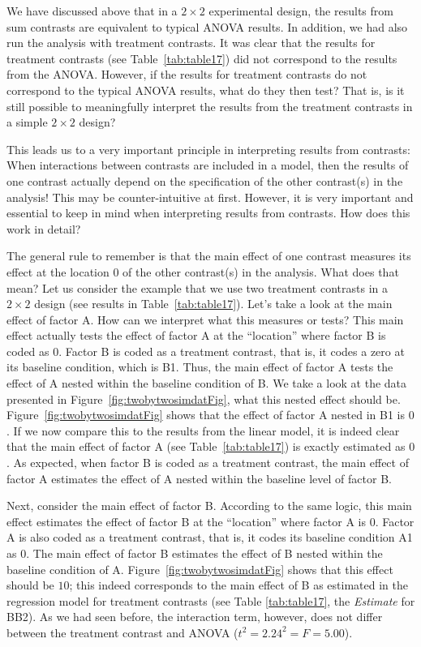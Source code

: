 \documentclass[12pt,]{krantz}
\begin{document}
We have discussed above that in a \(2 \times 2\) experimental design, the results from sum contrasts are equivalent to typical ANOVA results. In addition, we had also run the analysis with treatment contrasts. It was clear that the results for treatment contrasts (see Table~\ref{tab:table17}) did not correspond to the results from the ANOVA. However, if the results for treatment contrasts do not correspond to the typical ANOVA results, what do they then test? That is, is it still possible to meaningfully interpret the results from the treatment contrasts in a simple \(2 \times 2\) design?

This leads us to a very important principle in interpreting results from contrasts: When interactions between contrasts are included in a model, then the results of one contrast actually depend on the specification of the other contrast(s) in the analysis! This may be counter-intuitive at first. However, it is very important and essential to keep in mind when interpreting results from contrasts. How does this work in detail?

The general rule to remember is that the main effect of one contrast measures its effect at the location \(0\) of the other contrast(s) in the analysis. What does that mean? Let us consider the example that we use two treatment contrasts in a \(2 \times 2\) design (see results in Table~\ref{tab:table17}). Let's take a look at the main effect of factor A. How can we interpret what this measures or tests? This main effect actually tests the effect of factor A at the ``location'' where factor B is coded as \(0\). Factor B is coded as a treatment contrast, that is, it codes a zero at its baseline condition, which is B1. Thus, the main effect of factor A tests the effect of A nested within the baseline condition of B. We take a look at the data presented in Figure~\ref{fig:twobytwosimdatFig}, what this nested effect should be. Figure~\ref{fig:twobytwosimdatFig} shows that the effect of factor A nested in B1 is \(0\). If we now compare this to the results from the linear model, it is indeed clear that the main effect of factor A (see Table~\ref{tab:table17}) is exactly estimated as \(0\). As expected, when factor B is coded as a treatment contrast, the main effect of factor A estimates the effect of A nested within the baseline level of factor B.

Next, consider the main effect of factor B. According to the same logic, this main effect estimates the effect of factor B at the ``location'' where factor A is \(0\). Factor A is also coded as a treatment contrast, that is, it codes its baseline condition A1 as \(0\). The main effect of factor B estimates the effect of B nested within the baseline condition of A. Figure~\ref{fig:twobytwosimdatFig} shows that this effect should be \(10\); this indeed corresponds to the main effect of B as estimated in the regression model for treatment contrasts (see Table \ref{tab:table17}, the \emph{Estimate} for BB2). As we had seen before, the interaction term, however, does not differ between the treatment contrast and ANOVA (\(t^2 = 2.24^2 = F = 5.00\)).
\end{document}
